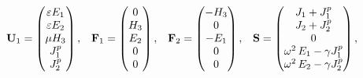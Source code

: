 \begin{equation*}
  \begin{array}{ccccc}
    \mathbf{U}_1 = \begin{pmatrix} \varepsilon E_1 \\ \varepsilon E_2 \\ \mu H_3 \\ J^p_1 \\  J^p_2 \end{pmatrix} ,
 &
   \mathbf{F}_1 = \begin{pmatrix} 0 \\ H_3 \\ E_2 \\ 0 \\  0 \end{pmatrix} ,
 &
   \mathbf{F}_2 = \begin{pmatrix} - H_3 \\ 0 \\ -E_1 \\ 0 \\ 0 \end{pmatrix} ,
 &
   \mathbf{S} = \begin{pmatrix} J_1 + J^p_1 \\ J_2+ J^p_2 \\ 0 \\ \omega^2 \, E_1 - \gamma J^p_1 \\  \omega^2 \, E_2 - \gamma J^p_2 \end{pmatrix} ,
  \end{array}
  \:
\end{equation*}

